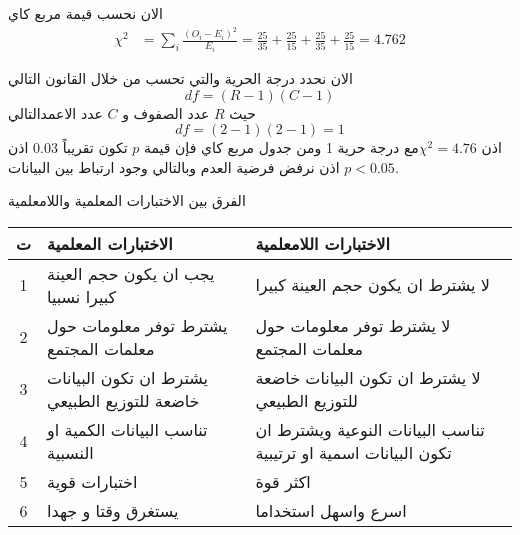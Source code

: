 		\begin{frame}
			\begin{exampleblock}{}
				
				الان نحسب قيمة مربع كاي
				\begin{align*}
					\chi^2 &= \sum_i \frac{(O_i - E_i)^2}{E_i} 
					= \frac{25}{35} + \frac{25}{15} + \frac{25}{35} + \frac{25}{15}
					= 4.762
				\end{align*}
				
				الان نحدد درجة الحرية والتي تحسب من خلال القانون التالي
				\[
				df = (R-1)(C-1)
				\]
				حيث $R$ عدد الصفوف و $C$ عدد الاعمدالتالي
				\[
				df = (2-1)(2-1) = 1
				\]
				اذن $\chi^2 = 4.76$مع درجة حرية 1 ومن جدول مربع كاي فإن قيمة $p$ تكون تقريباً $0.03$ اذن $p < 0.05$ اذن نرفض فرضية العدم وبالتالي وجود ارتباط بين البيانات.
			\end{exampleblock}
		\end{frame}
		
		
		\begin{frame}{الفرق بين الاختبارات المعلمية واللامعلمية}
			\begin{center}
				\begin{tabular}{|c|>{\raggedleft\arraybackslash}p{5cm}|>{\raggedleft\arraybackslash}p{5cm}|}
					\hline
					\textbf{ت} & \textbf{الاختبارات المعلمية} & \textbf{الاختبارات اللامعلمية} \\
					\hline
					1 & يجب ان يكون حجم العينة كبيرا نسبيا & لا يشترط ان يكون حجم العينة كبيرا \\
					\hline
					2 & يشترط توفر معلومات حول معلمات المجتمع & لا يشترط توفر معلومات حول معلمات المجتمع \\
					\hline
					3 & يشترط ان تكون البيانات خاضعة للتوزيع الطبيعي & لا يشترط ان تكون البيانات خاضعة للتوزيع الطبيعي \\
					\hline
					4 & تناسب البيانات الكمية او النسبية & تناسب البيانات النوعية ويشترط ان تكون البيانات اسمية او ترتيبية \\
					\hline
					5 & اختبارات قوية & اكثر قوة \\
					\hline
					6 & يستغرق وقتا و جهدا & اسرع واسهل استخداما \\
					\hline
				\end{tabular}
			\end{center}
		\end{frame}
		
